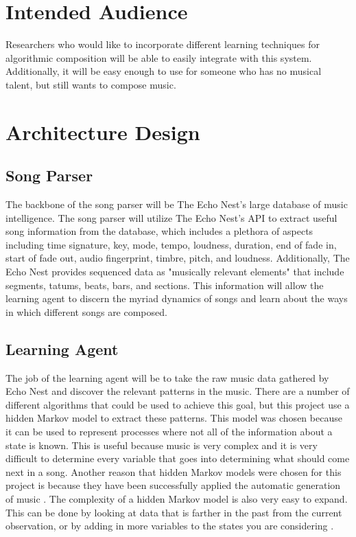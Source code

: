\documentclass{article}
\begin{document}
\section{Intended Audience}
Researchers who would like to incorporate different learning techniques for algorithmic composition will be able to easily integrate with this system. Additionally, it will be easy enough to use for someone who has no musical talent, but still wants to compose music.

\section{Architecture Design}
\subsection{Song Parser}
The backbone of the song parser will be The Echo Nest's large database of music intelligence. The song parser will utilize The Echo Nest's API to extract useful song information from the database, which includes a plethora of aspects including time signature, key, mode, tempo, loudness, duration, end of fade in, start of fade out, audio fingerprint, timbre, pitch, and loudness. Additionally, The Echo Nest provides sequenced data as "musically relevant elements" that include segments, tatums, beats, bars, and sections. This information will allow the learning agent to discern the myriad dynamics of songs and learn about the ways in which different songs are composed.

\subsection{Learning Agent}
The job of the learning agent will be to take the raw music data gathered by Echo Nest and discover the relevant patterns in the music. There are a number of different algorithms that could be used to achieve this goal, but this project use a hidden Markov model to extract these patterns. This model was chosen because it can be used to represent processes where not all of the information about a state is known. This is useful because music is very complex and it is very difficult to determine every variable that goes into determining what should come next in a song. Another reason that hidden Markov models were chosen for this project is because they have been successfully applied the automatic generation of music \cite{5492670}. The complexity of a hidden Markov model is also very easy to expand. This can be done by looking at data that is farther in the past from the current observation, or by adding in more variables to the states you are considering \cite{Wiki}.\\
\end{document}
